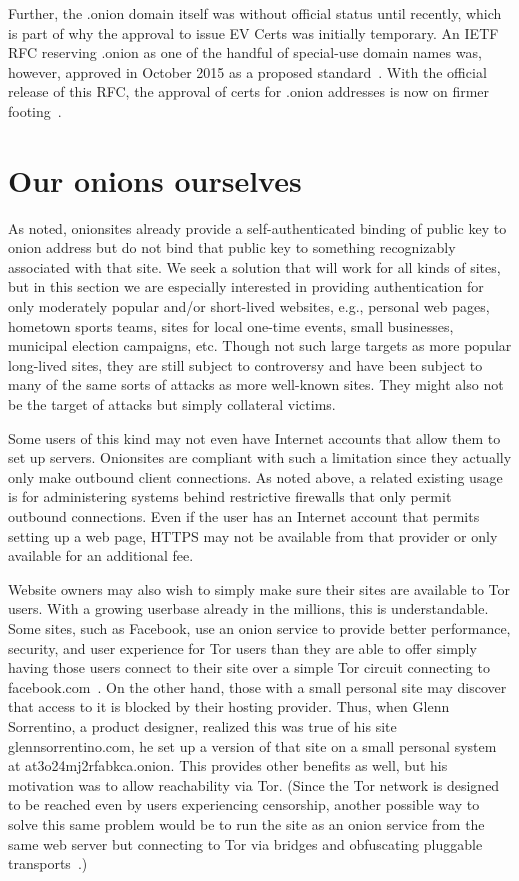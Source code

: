 \documentclass[10pt, conference, compsocconf]{styles/IEEEtran}
\begin{document}
Further, the .onion domain itself was without official status until
recently, which is part of why the approval to issue EV Certs was initially
temporary. An IETF RFC reserving .onion as one of the handful of
special-use domain names was, however, approved in October 2015 as a
proposed standard~\cite{ietf-onion-tld-rfc}.  With the official
release of this RFC, the approval of certs for .onion addresses is now
on firmer footing~\cite{7686-and-all}. 


\section{Our onions ourselves}
\label{ourselves}

As noted, onionsites already provide a self-authenticated binding of
public key to onion address but do not bind that public key to
something recognizably associated with that site.  We seek a solution
that will work for all kinds of sites, but in this section we are
especially interested in providing authentication for only moderately
popular and/or short-lived websites, e.g., personal web pages,
hometown sports teams, sites for local one-time events, small
businesses, municipal election campaigns, etc.  Though not such large
targets as more popular long-lived sites, they are still subject to
controversy and have been subject to many of the same sorts of attacks
as more well-known sites.  They might also not be the target of
attacks but simply collateral victims.

Some users of this kind may not even have Internet accounts that allow
them to set up servers. Onionsites are compliant with such a
limitation since they actually only make outbound client
connections. As noted above, a related existing usage is for
administering systems behind restrictive firewalls that only permit
outbound connections.  Even if the user has an Internet account that
permits setting up a web page, HTTPS may not be available from that
provider or only available for an additional fee.

Website owners may also wish to simply make sure their sites are
available to Tor users. With a growing userbase already in the
millions, this is understandable.  Some sites, such as Facebook, use an
onion service to provide better performance, security, and user
experience for Tor users than they are able to offer simply having
those users connect to their site over a simple Tor circuit connecting
to facebook.com~\cite{7686-and-all}. On the other hand, those with a
small personal site may discover that access to it is blocked by
their hosting provider.  Thus, when Glenn Sorrentino, a product
designer, realized this was true of his site glennsorrentino.com, he
set up a version of that site on a small personal system at
at3o24mj2rfabkca.onion. This provides other benefits as well, but his
motivation was to allow reachability via Tor. (Since the Tor network
is designed to be reached even by users experiencing censorship,
another possible way to solve this same problem would be to run the
site as an onion service from the same web server but
connecting to Tor via bridges and obfuscating pluggable
transports~\cite{bridges}.)
\end{document}
